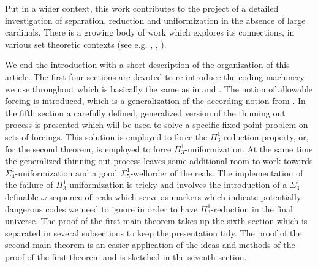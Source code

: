 \documentclass[a4paper,11pt]{article}
\begin{document}
Put in a wider context, this work contributes to the project of a detailed investigation of separation, reduction and uniformization in the absence of large cardinals. There is a growing body of work which explores its connections, in various set theoretic contexts (see e.g. \cite{Separation without reduction}, \cite{Forcing axioms and uniformization}, \cite{MA and failure of separation}). 


We end the introduction with a short description of the organization of this article.
The first four sections are devoted to re-introduce the coding machinery we use throughout which is basically the same as in \cite{Reduction} and \cite{Uniformization}. The notion of allowable forcing is introduced, which is a generalization of the according notion from \cite{Reduction}. In the fifth section a carefully defined, generalized version of the thinning out process is presented which will be used to solve a specific fixed point problem on sets of forcings. This solution is employed to force the $\Pi^1_3$-reduction property, or, for the second theorem, is employed to force $\Pi^1_3$-uniformization. At the same time the generalized thinning out process leaves some additional room to work towards $\Sigma^1_4$-uniformization and a good $\Sigma^1_5$-wellorder of the reals. The implementation of  the failure of $\Pi^1_3$-uniformization is tricky and involves the introduction of a $\Sigma^1_3$-definable $\omega$-sequence of reals which serve as markers which indicate potentially dangerous codes we need to ignore in order to have $\Pi^1_3$-reduction in the final universe. The proof of the first main theorem takes up the sixth section which is separated in several subsections to keep the presentation tidy. 
The proof of the second main theorem is an easier application of the ideas and methods of the proof of the first theorem and is sketched in the seventh section.
\end{document}
